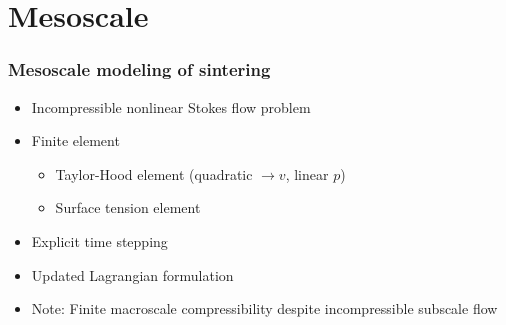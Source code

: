 \documentclass[11pt,mathserif]{beamer}
\begin{document}
\section{Mesoscale}
\begin{frame}
 \frametitle{Mesoscale modeling of sintering}

 \begin{itemize}
  \item Incompressible nonlinear Stokes flow problem
  \item Finite element
  \begin{itemize}
    \item Taylor-Hood element (quadratic $\to v$, linear $p$)
    \item Surface tension element
  \end{itemize}
  \item Explicit time stepping
  \item Updated Lagrangian formulation
  \item \alert{Note: Finite macroscale compressibility despite incompressible subscale flow}
 \end{itemize}


\end{frame}
\end{document}
